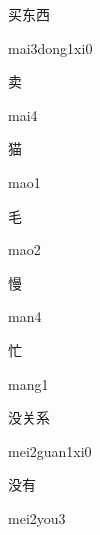 \begin{multicols*}{2}
\begin{verbete}{买东西}
\begin{pronuncia}{mai3dong1xi0}
\end{pronuncia}
\end{verbete}

\begin{verbete}[mai4]{卖}
\begin{pronuncia}{mai4}
\end{pronuncia}
\end{verbete}

\begin{verbete}[mao1]{猫}
\begin{pronuncia}{mao1}
\end{pronuncia}
\end{verbete}

\begin{verbete}[mao2]{毛}
\begin{pronuncia}{mao2}
\end{pronuncia}
\end{verbete}

\begin{verbete}[man4]{慢}
\begin{pronuncia}{man4}
\end{pronuncia}
\end{verbete}

\begin{verbete}[mang1]{忙}
\begin{pronuncia}{mang1}
\end{pronuncia}
\end{verbete}

\begin{verbete}{没关系}
\begin{pronuncia}{mei2guan1xi0}
\end{pronuncia}
\end{verbete}

\begin{verbete}{没有}
\begin{pronuncia}{mei2you3}
\end{pronuncia}
\end{verbete}


\end{multicols*}
